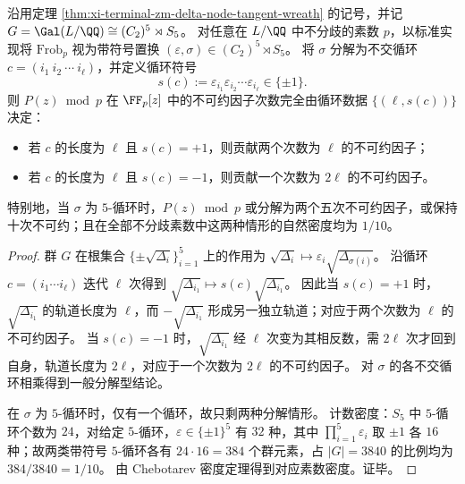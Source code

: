 \begin{theorem}[十次分支多项式的带符号循环分解律与密度刻画]\label{thm:xi-terminal-zm-delta-node-tangent-signed-cycle-factorization}
沿用定理 \ref{thm:xi-terminal-zm-delta-node-tangent-wreath} 的记号，并记
\(
G=\Gal(L/\QQ)\cong (C_2)^5\rtimes S_5
\)。
对任意在 \(L/\QQ\) 中不分歧的素数 \(p\)，以标准实现将 \(\mathrm{Frob}_p\) 视为带符号置换 \((\varepsilon,\sigma)\in (C_2)^5\rtimes S_5\)。
将 \(\sigma\) 分解为不交循环 \(c=(i_1\ i_2\ \cdots\ i_\ell)\)，并定义循环符号
\[
s(c):=\varepsilon_{i_1}\varepsilon_{i_2}\cdots \varepsilon_{i_\ell}\in\{\pm 1\}.
\]
则 \(P(z)\bmod p\) 在 \(\FF_p[z]\) 中的不可约因子次数完全由循环数据 \(\{(\ell,s(c))\}\) 决定：
\begin{itemize}
  \item 若 \(c\) 的长度为 \(\ell\) 且 \(s(c)=+1\)，则贡献两个次数为 \(\ell\) 的不可约因子；
  \item 若 \(c\) 的长度为 \(\ell\) 且 \(s(c)=-1\)，则贡献一个次数为 \(2\ell\) 的不可约因子。
\end{itemize}
特别地，当 \(\sigma\) 为 \(5\)-循环时，\(P(z)\bmod p\) 或分解为两个五次不可约因子，或保持十次不可约；且在全部不分歧素数中这两种情形的自然密度均为 \(1/10\)。
\end{theorem}
\begin{proof}
群 \(G\) 在根集合 \(\{\pm\sqrt{\Delta_i}\}_{i=1}^5\) 上的作用为
\(
\sqrt{\Delta_i}\mapsto \varepsilon_i\sqrt{\Delta_{\sigma(i)}}
\)。
沿循环 \(c=(i_1\cdots i_\ell)\) 迭代 \(\ell\) 次得到
\(
\sqrt{\Delta_{i_1}}\mapsto s(c)\sqrt{\Delta_{i_1}}
\)。
因此当 \(s(c)=+1\) 时，\(\sqrt{\Delta_{i_1}}\) 的轨道长度为 \(\ell\)，而 \(-\sqrt{\Delta_{i_1}}\) 形成另一独立轨道；对应于两个次数为 \(\ell\) 的不可约因子。
当 \(s(c)=-1\) 时，\(\sqrt{\Delta_{i_1}}\) 经 \(\ell\) 次变为其相反数，需 \(2\ell\) 次才回到自身，轨道长度为 \(2\ell\)，对应于一个次数为 \(2\ell\) 的不可约因子。
对 \(\sigma\) 的各不交循环相乘得到一般分解型结论。
\par
在 \(\sigma\) 为 \(5\)-循环时，仅有一个循环，故只剩两种分解情形。
计数密度：\(S_5\) 中 \(5\)-循环个数为 \(24\)，对给定 \(5\)-循环，\(\varepsilon\in\{\pm1\}^5\) 有 \(32\) 种，其中 \(\prod_{i=1}^5\varepsilon_i\) 取 \(\pm1\) 各 \(16\) 种；故两类带符号 \(5\)-循环各有 \(24\cdot 16=384\) 个群元素，占 \(|G|=3840\) 的比例均为 \(384/3840=1/10\)。
由 Chebotarev 密度定理得到对应素数密度。证毕。
\end{proof}

